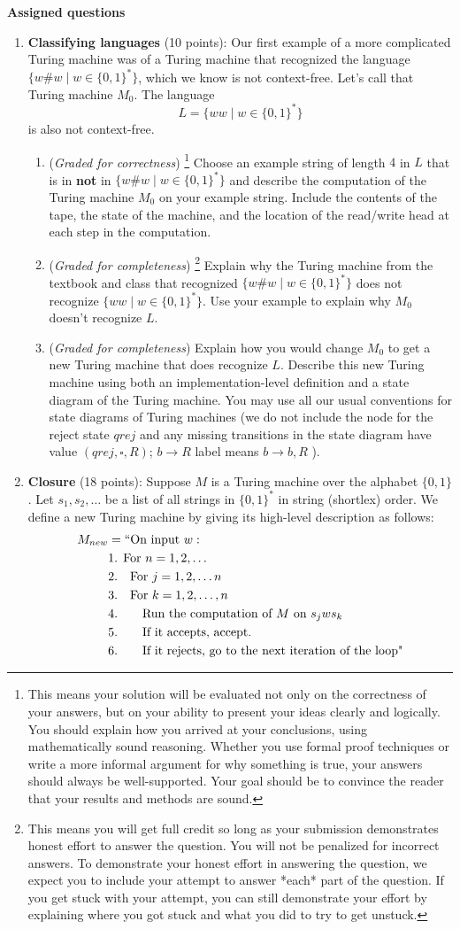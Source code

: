 \documentclass[12pt, oneside]{article}
\newcommand{\gradeCorrect}{({\it Graded for correctness}) }
\newcommand{\gradeCorrectFirst}{\gradeCorrect\footnote{This means your solution 
will be evaluated not only on the correctness of your answers, but on your ability
to present your ideas clearly and logically. You should explain how you 
arrived at your conclusions, using
mathematically sound reasoning. Whether you use formal proof techniques or 
write a more informal argument
for why something is true, your answers should always be well-supported. 
Your goal should be to convince the
reader that your results and methods are sound.} }
\newcommand{\gradeComplete}{({\it Graded for completeness}) }
\newcommand{\gradeCompleteFirst}{\gradeComplete\footnote{This means you will 
get full credit so long as your submission demonstrates honest effort to 
answer the question. You will not be penalized for incorrect answers. 
To demonstrate your honest effort in answering the question, we 
expect you to include your attempt to answer *each* part of the question. 
If you get stuck with your attempt, you can still demonstrate 
your effort by explaining where you got stuck and what 
you did to try to get unstuck.} }
\begin{document}
{\bf Assigned questions}
\begin{enumerate}[wide, labelwidth=!, labelindent=0pt]

\item\textbf{Classifying languages} (10 points):
Our first example of a more complicated Turing machine was of a Turing machine 
that recognized the language $\{w \# w \mid w \in\{0,1\}^*\}$, which we 
know is not context-free. Let's call that Turing machine $M_0$. The language
\[
    L = \{ww \mid w \in \{0,1\}^*\}
\]
is also not context-free. 

\begin{enumerate}
    \item\gradeCorrectFirst Choose an example string of length $4$ in $L$ that is in {\bf not} in $\{w \# w \mid w \in\{0,1\}^*\}$ and describe the computation of the Turing machine $M_0$ on your example string. 
    Include the contents of the  tape, the state of the machine, and the location of the read/write head at each step in the computation.
    \item\gradeCompleteFirst Explain why the Turing machine from the textbook 
    and class that recognized $\{w \# w \mid w \in\{0,1\}^*\}$ does 
    not recognize $\{ww \mid w \in \{0,1\}^*\}$. Use your example to explain why $M_0$ doesn't recognize $L$.
    \item\gradeComplete Explain how you would change $M_0$ to get a 
    new Turing machine that does recognize $L$. Describe this new Turing machine using both an implementation-level definition and a state diagram of the Turing machine. You may use all 
    our usual conventions for state diagrams of Turing machines 
    (we do not include the node for the reject state $qrej$ and any missing transitions 
    in the state diagram have value $(qrej,\square,R)$; 
    $b \to R$ label means $b \to b, R$ ).
\end{enumerate}

\item\textbf{Closure} (18 points):
Suppose $M$ is a Turing machine over the alphabet $\{0,1\}$. 
Let $s_1, s_2, \ldots$ be a list of all strings in 
$\{0,1\}^*$ in string (shortlex) order.
We define a new Turing machine 
by giving its high-level description as follows: 
\begin{align*}
   M_{new} &= ``\text{On input }w:\\
    &\text{1. For $n = 1, 2, \ldots$}\\
    &\text{2.~~~For $j = 1, 2, \ldots n$} \\
    &\text{3.~~~For $k = 1, 2, \ldots, n$} \\
    &\text{4.~~~~~~Run the computation of $M$ on $s_jws_k$}\\
    &\text{5.~~~~~~If it accepts, accept.}\\
    &\text{6.~~~~~~If it rejects, go to the next iteration of the loop"}\\
\end{align*}


\end{enumerate}
\end{document}
